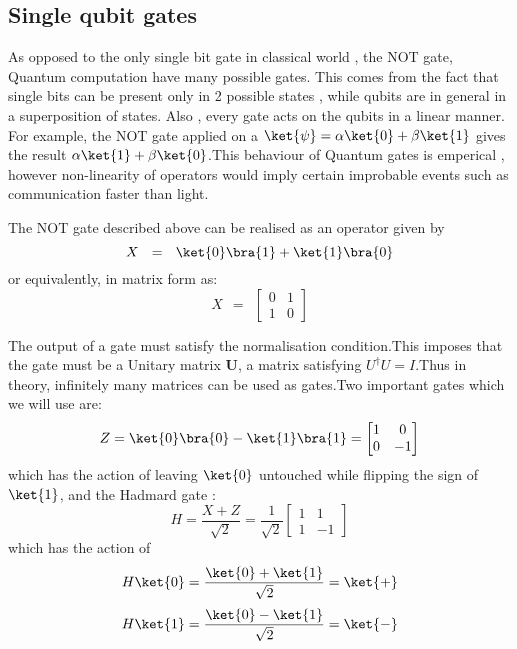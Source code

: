 \subsection{Single qubit gates}
As opposed to the only single bit gate in classical world , the NOT gate, Quantum computation have many possible gates. This comes from the fact that single bits can be present only in 2 possible states , while qubits are in general in a superposition of states.
Also , every gate acts on the qubits in a linear manner. For example, the NOT gate applied on a $\ket{\psi} = \alpha \ket{0} + \beta \ket{1}$ gives the result $\alpha\ket{1} + \beta \ket{0}$.This behaviour of Quantum gates is emperical , however non-linearity of operators would imply certain improbable events such as communication faster than light.\par
The NOT gate described above can be realised as an operator given by
$$ X ~~= ~~ \ket{0}\bra{1} + \ket{1}\bra{0} $$
or equivalently, in matrix form as:
$$X ~~= ~~ \begin{bmatrix}0 & 1\\1 & 0 \end{bmatrix}$$ \par
The output of a gate must satisfy the normalisation condition.This 
imposes that the gate must be a Unitary matrix \textbf{U}, a matrix satisfying $U^{\dagger}U = I$.Thus in theory, infinitely many matrices can be used as gates.Two important gates which we will use are:
$$Z = \ket{0}\bra{0} - \ket{1}\bra{1} = \begin{bmatrix}1 &0\\0&-1 \end{bmatrix}$$
which has the action of leaving $\ket{0}$ untouched while flipping the sign of $\ket{1}$, and the Hadmard gate :
$$H = \frac{X+Z}{\sqrt{2}}= \frac{1}{\sqrt{2}}\begin{bmatrix}1&1\\1&-1 \end{bmatrix}$$
which has the action of
    $$H \ket{0} = \frac{\ket{0}+\ket{1}}{\sqrt{2}} = \ket{+}$$
    $$H \ket{1} = \frac{\ket{0}-\ket{1}}{\sqrt{2}} = \ket{-}$$

